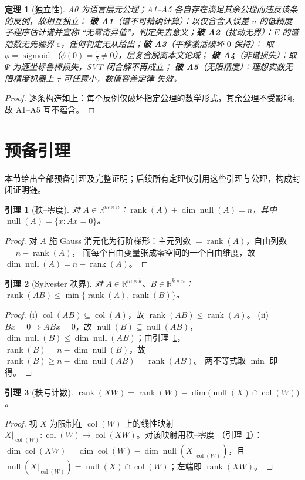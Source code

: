 \documentclass[UTF8,11pt,a4paper]{ctexart}
\theoremstyle{plain}
\newtheorem{lemma}{引理}
\newtheorem{theorem}{定理}
\theoremstyle{definition}
\theoremstyle{remark}
\newcommand{\R}{\mathbb{R}}
\newcommand{\rank}{\operatorname{rank}}
\newcommand{\nullsp}{\operatorname{null}}
\newcommand{\colsp}{\operatorname{col}}
\newcommand{\half}{\tfrac12}
\begin{document}
\begin{theorem}[独立性]\label{thm:independence}
A0 为语言层元公理；A1--A5 各自存在满足其余公理而违反该条的反例，故相互独立：
\textbf{破 A1}（谱不可精确计算）：以仅含舍入误差 $u$ 的低精度子程序估计谱并宣称
“无零奇异值”，判定失去意义；\textbf{破 A2}（扰动无界）：$E$ 的谱范数无先验界
$\varepsilon$，任何判定无从给出；\textbf{破 A3}（平移激活破坏 $0$ 保持）：
取 $\phi=\operatorname{sigmoid}$（$\phi(0)=\half\ne0$），层复合脱离本文论域；
\textbf{破 A4}（非谱损失）：取 $\Psi$ 为逐坐标鲁棒损失，SVT 闭合解不再成立；
\textbf{破 A5}（无限精度）：理想实数无限精度机器上 $\tau$ 可任意小，数值容差定律
失效。
\end{theorem}
\begin{proof}
逐条构造如上：每个反例仅破坏指定公理的数学形式，其余公理不受影响，故 A1--A5
互不蕴含。
\end{proof}

\section{预备引理}\label{sec:lemmas}

本节给出全部预备引理及完整证明；后续所有定理仅引用这些引理与公理，构成封闭证明链。

\begin{lemma}[秩--零度]\label{lem:ranknull}
对 $A\in\R^{m\times n}$：$\rank(A)+\dim\nullsp(A)=n$，其中
$\nullsp(A)=\{x:Ax=0\}$。
\end{lemma}
\begin{proof}
对 $A$ 施 Gauss 消元化为行阶梯形：主元列数 $=\rank(A)$，自由列数 $=n-\rank(A)$，
而每个自由变量张成零空间的一个自由维度，故 $\dim\nullsp(A)=n-\rank(A)$。
\end{proof}

\begin{lemma}[Sylvester 秩界]\label{lem:sylvester}
对 $A\in\R^{m\times k}$、$B\in\R^{k\times n}$：
$\rank(AB)\le\min\{\rank(A),\rank(B)\}$\cite{sylvester1884,horn1991}。
\end{lemma}
\begin{proof}
(i) $\colsp(AB)\subseteq\colsp(A)$，故 $\rank(AB)\le\rank(A)$。
(ii) $Bx=0\Rightarrow ABx=0$，故 $\nullsp(B)\subseteq\nullsp(AB)$，
$\dim\nullsp(B)\le\dim\nullsp(AB)$；由引理~\ref{lem:ranknull}，
$\rank(B)=n-\dim\nullsp(B)$，故
$\rank(B)\ge n-\dim\nullsp(AB)=\rank(AB)$。
两不等式取 $\min$ 即得。
\end{proof}

\begin{lemma}[秩亏计数]\label{lem:rankdef}
$\rank(XW)=\rank(W)-\dim\big(\nullsp(X)\cap\colsp(W)\big)$。
\end{lemma}
\begin{proof}
视 $X$ 为限制在 $\colsp(W)$ 上的线性映射
$X|_{\colsp(W)}:\colsp(W)\to\colsp(XW)$。对该映射用秩--零度
（引理~\ref{lem:ranknull}）：
$\dim\colsp(XW)=\dim\colsp(W)-\dim\nullsp(X|_{\colsp(W)})$，且
$\nullsp(X|_{\colsp(W)})=\nullsp(X)\cap\colsp(W)$；左端即 $\rank(XW)$。
\end{proof}
\end{document}
